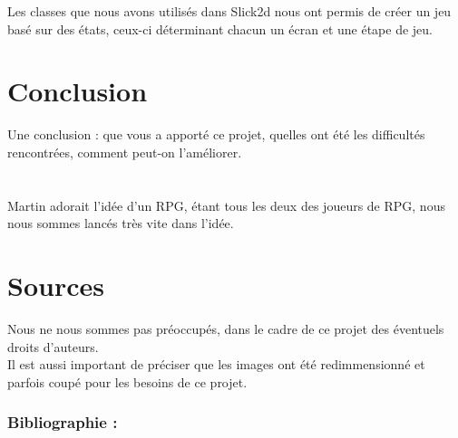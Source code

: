 \documentclass[a4paper,titlepage]{article}
\begin{document}
Les classes que nous avons utilisés dans Slick2d nous ont permis de créer un jeu basé sur des états, ceux-ci déterminant chacun un écran et une étape de jeu.
	\section{Conclusion}
	Une conclusion : que vous a apporté ce projet, quelles ont été les difficultés rencontrées, comment peut-on l’améliorer.\\
	\\
	\\
	Martin adorait l'idée d'un RPG, étant tous les deux des joueurs de RPG, nous nous sommes lancés très vite dans l'idée.
	\clearpage
	\section*{Sources }
\danger Nous ne nous sommes pas préoccupés, dans le cadre de ce projet des éventuels droits d'auteurs.\\

Il est aussi important de préciser que les images ont été redimmensionné et parfois coupé pour les besoins de ce projet.	
	
\subsubsection*{Bibliographie :}
\end{document}
